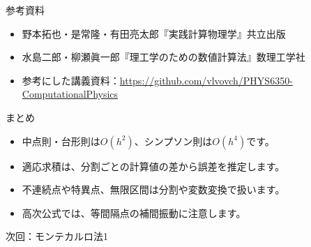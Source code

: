 \documentclass[12pt,aspectratio=43]{beamer}
\begin{document}
\begin{frame}[t]{参考資料}
  \begin{itemize}
    \setlength{\itemsep}{4mm}
    \item 野本拓也・是常隆・有田亮太郎『実践計算物理学』共立出版
    \item 水島二郎・柳瀬眞一郎『理工学のための数値計算法』数理工学社
    \item 参考にした講義資料：\url{https://github.com/vlvovch/PHYS6350-ComputationalPhysics}
  \end{itemize}
\end{frame}

\begin{frame}[t]{まとめ}
  \begin{itemize}
    \setlength{\itemsep}{3mm}
    \item 中点則・台形則は$O(h^2)$、シンプソン則は$O(h^4)$です。
    \item 適応求積は、分割ごとの計算値の差から誤差を推定します。
    \item 不連続点や特異点、無限区間は分割や変数変換で扱います。
    \item 高次公式では、等間隔点の補間振動に注意します。
  \end{itemize}
  \vfill
  次回：モンテカルロ法1
\end{frame}
\end{document}
